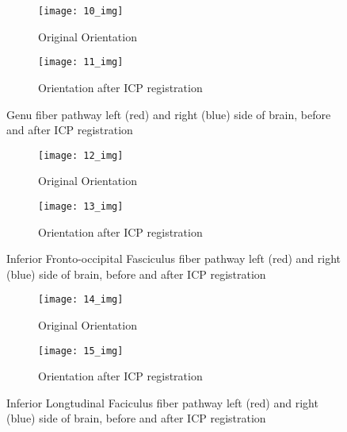 \documentclass[../structure.tex]{subfiles}
\begin{document}
\begin{figure}[H]
	\centering
	\begin{subfigure}[b]{0.49\textwidth}
	\centering
	\texttt{[image: 10\_img]}
	\caption{Original Orientation}
	\end{subfigure}
	\begin{subfigure}[b]{0.49\textwidth}
	\centering
	\texttt{[image: 11\_img]}
	\caption{Orientation after ICP registration}
	\end{subfigure}
\captionsetup{justification=centering}
\caption{Genu fiber pathway left (red) and right (blue) side of brain, before and after ICP registration}
\label{fig:pca}
\end{figure}

\begin{figure}[H]
	\centering
	\begin{subfigure}[b]{0.49\textwidth}
	\centering
	\texttt{[image: 12\_img]}
	\caption{Original Orientation}
	\end{subfigure}
	\begin{subfigure}[b]{0.49\textwidth}
	\centering
	\texttt{[image: 13\_img]}
	\caption{Orientation after ICP registration}
	\end{subfigure}
\captionsetup{justification=centering}
\caption{Inferior Fronto-occipital Fasciculus fiber pathway left (red) and right (blue) side of brain, before and after ICP registration}
\label{fig:pca}
\end{figure}

\begin{figure}[H]
	\centering
	\begin{subfigure}[b]{0.49\textwidth}
	\centering
	\texttt{[image: 14\_img]}
	\caption{Original Orientation}
	\end{subfigure}
	\begin{subfigure}[b]{0.49\textwidth}
	\centering
	\texttt{[image: 15\_img]}
	\caption{Orientation after ICP registration}
	\end{subfigure}
\captionsetup{justification=centering}
\caption{Inferior Longtudinal Faciculus fiber pathway left (red) and right (blue) side of brain, before and after ICP registration}
\label{fig:pca}
\end{figure}

\end{document}
